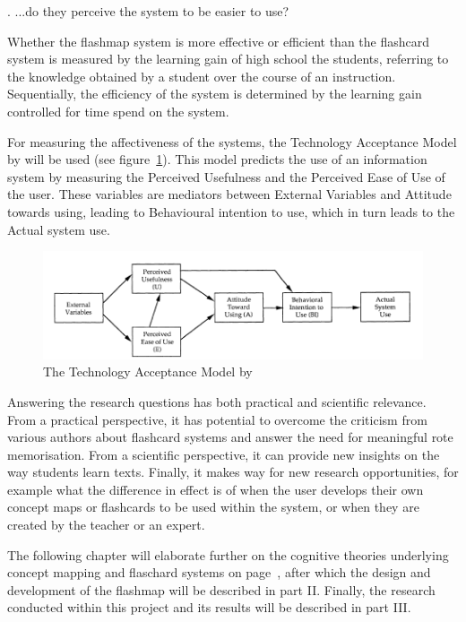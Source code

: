 \label{ease}
. ...do they perceive the system to be easier to use?

Whether the flashmap system is more effective or efficient than the flashcard system is measured by the learning gain of high school the students, referring to the knowledge obtained by a student over the course of an instruction. Sequentially, the efficiency of the system is determined by the learning gain controlled for time spend on the system.

For measuring the affectiveness of the systems, the Technology Acceptance Model by  will be used (see figure~\ref{fig:tam}). This model predicts the use of an information system by measuring the Perceived Usefulness and the Perceived Ease of Use of the user. These variables are mediators between External Variables and Attitude towards using, leading to Behavioural intention to use, which in turn leads to the Actual system use.

\begin{figure}
    \centering
    \includegraphics[width=\textwidth]{img/tam}
    \caption{The Technology Acceptance Model by \protect{}}
    \label{fig:tam}
\end{figure}

Answering the research questions has both practical and scientific relevance. From a practical perspective, it has potential to overcome the criticism from various authors about flashcard systems and answer the need for meaningful rote memorisation. From a scientific perspective, it can provide new insights on the way students learn texts. Finally, it makes way for new research opportunities, for example what the difference in effect is of when the user develops their own concept maps or flashcards to be used within the system, or when they are created by the teacher or an expert. 

The following chapter will elaborate further on the cognitive theories underlying concept mapping and flaschard systems on page~\pageref{ch:theory}, after which the design and development of the flashmap will be described in part II. Finally, the research conducted within this project and its results will be described in part III.

